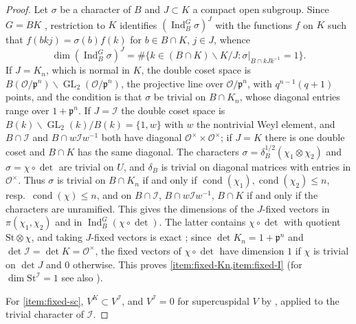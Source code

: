 \documentclass[11pt,reqno]{amsart}
\numberwithin{equation}{section}
\theoremstyle{plain}
\theoremstyle{definition}
\theoremstyle{remark}
\theoremstyle{plain}
\newcommand{\OO}{\mathcal{O}}    %
\newcommand{\pp}{\mathfrak{p}}   %
\newcommand{\St}{\mathrm{St}}                   %
\newcommand{\Iw}{\mathcal{I}}                   %
\DeclareMathOperator{\GL}{GL}
\DeclareMathOperator{\Ind}{Ind}
\DeclareMathOperator{\cond}{cond}   %
\begin{document}
\begin{proof}
Let $\sigma$ be a character of $B$ and $J\subset K$ a compact open
subgroup. Since $G=BK$ \cite[(7.2.1)]{MR2234120}, restriction to $K$ identifies
$(\Ind_B^G\sigma)^J$ with the functions $f$ on $K$ such that
$f(bkj)=\sigma(b)f(k)$ for $b\in B\cap K$, $j\in J$, whence
\[
\dim(\Ind_B^G\sigma)^J=\#\{k\in(B\cap K)\backslash K/J:
\sigma|_{B\cap kJk^{-1}}=1\}.
\]
If $J=K_n$, which is normal in $K$, the double coset space is
$B(\OO/\pp^n)\backslash\GL_2(\OO/\pp^n)$, the projective line over
$\OO/\pp^n$, with $q^{n-1}(q+1)$ points, and the condition is that
$\sigma$ be trivial on $B\cap K_n$, whose diagonal entries range over
$1+\pp^n$. If $J=\Iw$ the double coset space is
$B(k)\backslash\GL_2(k)/B(k)=\{1,w\}$ with $w$ the nontrivial Weyl
element, and $B\cap\Iw$ and $B\cap w\Iw w^{-1}$ both have diagonal
$\OO^\times\times\OO^\times$; if $J=K$ there is one double coset and
$B\cap K$ has the same diagonal. The characters
$\sigma=\delta_B^{1/2}(\chi_1\otimes\chi_2)$ and $\sigma=\chi\circ\det$
are trivial on $U$, and $\delta_B$ is trivial on diagonal matrices with
entries in $\OO^\times$. Thus $\sigma$ is trivial on $B\cap K_n$ if and
only if $\cond(\chi_1),\cond(\chi_2)\le n$, resp.\ $\cond(\chi)\le n$,
and on $B\cap\Iw$, $B\cap w\Iw w^{-1}$, $B\cap K$ if and only if the
characters are unramified. This gives the dimensions of the $J$-fixed
vectors in $\pi(\chi_1,\chi_2)$ and in $\Ind_B^G(\chi\circ\det)$. The
latter contains $\chi\circ\det$ with quotient $\St\otimes\chi$, and
taking $J$-fixed vectors is exact \cite[2.3~Proposition]{MR2234120}; since $\det K_n=1+\pp^n$ and
$\det\Iw=\det K=\OO^\times$, the fixed vectors of $\chi\circ\det$ have
dimension $1$ if $\chi$ is trivial on $\det J$ and $0$ otherwise. This
proves \cref{item:fixed-Kn,item:fixed-I} (for $\dim\St^{\Iw}=1$ see also
\cite[14.4~Example]{MR2234120}).

For \cref{item:fixed-sc}, $V^K\subset V^{\Iw}$, and $V^{\Iw}=0$ for
supercuspidal $V$ by \cite[14.3~Proposition]{MR2234120}, applied to the
trivial character of $\Iw$.
\end{proof}
\end{document}
